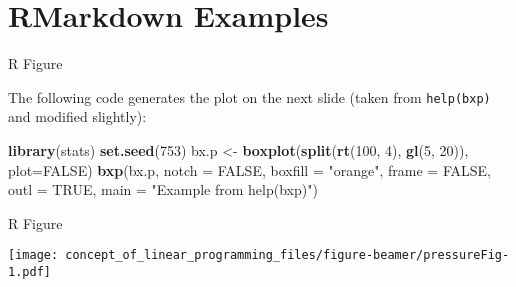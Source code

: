 \documentclass[14pt,ignorenonframetext,compress]{beamer}
\newenvironment{Shaded}{\begin{snugshade}}{\end{snugshade}}
\newcommand{\DataTypeTok}[1]{\textcolor[rgb]{0.13,0.29,0.53}{#1}}
\newcommand{\DecValTok}[1]{\textcolor[rgb]{0.00,0.00,0.81}{#1}}
\newcommand{\KeywordTok}[1]{\textcolor[rgb]{0.13,0.29,0.53}{\textbf{#1}}}
\newcommand{\NormalTok}[1]{#1}
\newcommand{\OtherTok}[1]{\textcolor[rgb]{0.56,0.35,0.01}{#1}}
\newcommand{\StringTok}[1]{\textcolor[rgb]{0.31,0.60,0.02}{#1}}
\renewenvironment{Shaded}{\color{black}\begin{snugshade}\color{black}}{\end{snugshade}}
\begin{document}
\hypertarget{rmarkdown-examples}{%
\section{RMarkdown Examples}\label{rmarkdown-examples}}

\begin{frame}[fragile]{R Figure}
\protect\hypertarget{r-figure}{}

The following code generates the plot on the next slide (taken from
\texttt{help(bxp)} and modified slightly):

\small

\begin{Shaded}
\begin{Highlighting}[]
\KeywordTok{library}\NormalTok{(stats)}
\KeywordTok{set.seed}\NormalTok{(}\DecValTok{753}\NormalTok{)}
\NormalTok{bx.p <-}\StringTok{ }\KeywordTok{boxplot}\NormalTok{(}\KeywordTok{split}\NormalTok{(}\KeywordTok{rt}\NormalTok{(}\DecValTok{100}\NormalTok{, }\DecValTok{4}\NormalTok{),}
                      \KeywordTok{gl}\NormalTok{(}\DecValTok{5}\NormalTok{, }\DecValTok{20}\NormalTok{)), }\DataTypeTok{plot=}\OtherTok{FALSE}\NormalTok{)}
\KeywordTok{bxp}\NormalTok{(bx.p, }\DataTypeTok{notch =} \OtherTok{FALSE}\NormalTok{, }\DataTypeTok{boxfill =} \StringTok{"orange"}\NormalTok{,}
    \DataTypeTok{frame =} \OtherTok{FALSE}\NormalTok{, }\DataTypeTok{outl =} \OtherTok{TRUE}\NormalTok{,}
    \DataTypeTok{main =} \StringTok{"Example from help(bxp)"}\NormalTok{)}
\end{Highlighting}
\end{Shaded}

\end{frame}

\begin{frame}{R Figure}
\protect\hypertarget{r-figure-1}{}

\texttt{[image: concept\_of\_linear\_programming\_files/figure-beamer/pressureFig-1.pdf]}

\end{frame}
\end{document}
